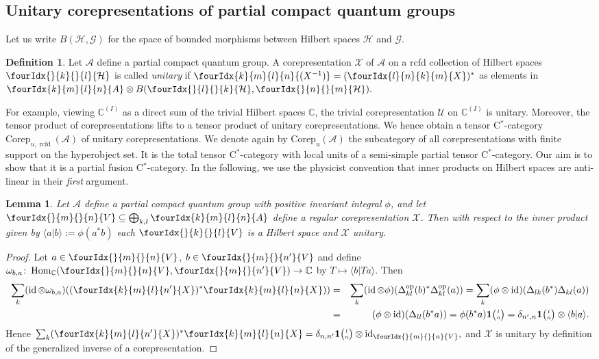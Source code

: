 \documentclass[10pt]{article}
\DeclareMathOperator{\id}{id}
\DeclareMathOperator{\Hom}{Hom}
\DeclareMathOperator{\op}{\mathrm{op}}
\DeclareMathOperator{\rcf}{\mathrm{rcfd}}
\newcommand{\Corep}{\mathrm{Corep}}
\newcommand{\C}{\mathbb{C}}
\newcommand{\Hsp}{\mathcal{H}}
\newcommand{\Grt}[3]{#1{\tiny {\begin{pmatrix} #2\\#3\end{pmatrix}}}}
\newcommand{\UnitC}[2]{\Grt{\mathbf{1}}{#1}{#2}}
\newcommand{\Gr}[5]{\fourIdx{#2}{#4}{#3}{#5}{#1}}%
\newcommand{\Gru}[3]{\Gr{#1}{}{}{#2}{#3}}
\newtheorem{Lem}[Theorem]{Lemma}
\theoremstyle{definition}
\newtheorem{Def}[Theorem]{Definition}
\numberwithin{equation}{section}
\begin{document}
\subsection{Unitary corepresentations of partial compact quantum groups}


Let us write $B(\Hsp,\mathcal{G})$ for the space of
bounded morphisms between Hilbert spaces $\Hsp$ and $\mathcal{G}$. 

\begin{Def} Let $\mathscr{A}$ define a partial compact quantum
  group. A corepresentation $\mathscr{X}$ of $\mathscr{A}$ on a rcfd collection of Hilbert spaces $\Gru{\Hsp}{k}{l}$ is called
   \emph{unitary}
  if $\Gr{(X^{-1})}{k}{l}{m}{n}=(\Gr{X}{l}{k}{n}{m})^{*}$ as elements in $\Gr{A}{k}{l}{m}{n}\otimes
  B(\Gru{\Hsp}{l}{k},\Gru{\Hsp}{n}{m}).$
\end{Def} 

For example, viewing $\C^{(I)}$ as a direct sum of the trivial Hilbert spaces $\C$, the
  trivial corepresentation $\mathscr{U}$ on $\C^{(I)}$ is unitary. Moreover, the tensor product of corepresentations lifts to a tensor product
of unitary corepresentations.  We hence obtain a tensor C$^*$-category $\Corep_{u,\rcf}(\mathscr{A})$ of unitary corepresentations. We denote again by $\Corep_u(\mathscr{A})$ the subcategory of all corepresentations with finite support on the hyperobject set. It is the total tensor C$^*$-category with local units of a semi-simple partial tensor C$^*$-category. Our aim is to show that it is a partial fusion C$^*$-category. In the following, we use the physicist convention that inner products on Hilbert spaces are anti-linear in their \emph{first} argument. 

\begin{Lem} \label{lemma:rep-regular-unitary}
  Let $\mathscr{A}$ define a partial compact quantum group with
positive invariant  integral $\phi$, and let $\Gru{V}{m}{n} \subseteq
\bigoplus_{k,l} \Gr{A}{k}{l}{m}{n}$ define a regular corepresentation $\mathscr{X}$. Then with
    respect to the inner product given by $\langle
    a|b\rangle:=\phi(a^{*}b)$ each $\Gru{V}{k}{l}$ is a Hilbert space and $\mathscr{X}$ unitary.
\end{Lem}
\begin{proof}   Let  $a\in \Gru{V}{m}{n}$, $b\in \Gru{V}{m}{n'}$ and define $\omega_{b,a} \colon
\Hom_{\C}(\Gru{V}{m}{n},\Gru{V}{m}{n'}) \to \C$ by $T
\mapsto \langle b|Ta\rangle$. Then
\begin{eqnarray*}
\sum_{k }(\id \otimes \omega_{b,a})
((\Gr{X}{k}{l}{m}{n'})^* \Gr{X}{k}{l}{m}{n}))  &=& \sum_k
(\id\otimes \phi)(\Delta_{kl}^{\op}(b)^*\Delta_{kl}^{\op}(a))
  = \sum_k (\phi\otimes
  \id)(\Delta_{lk}(b^*)\Delta_{kl}(a)) \\ &=& (\phi\otimes
  \id)(\Delta_{ll}(b^*a))  = \phi(b^*a)\UnitC{l}{n} =
  \delta_{n',n} \UnitC{l}{n} \otimes \langle b|a\rangle.
\end{eqnarray*} Hence $ \sum_{k}
    (\Gr{X}{k}{l}{m}{n'})^* \Gr{X}{k}{l}{m}{n} =
    \delta_{n,n'}\UnitC{l}{n}\otimes
    \id_{\Gru{V}{m}{n}},$ and $\mathscr{X}$ is unitary by definition of the generalized inverse of a corepresentation.
\end{proof} 
\end{document}
